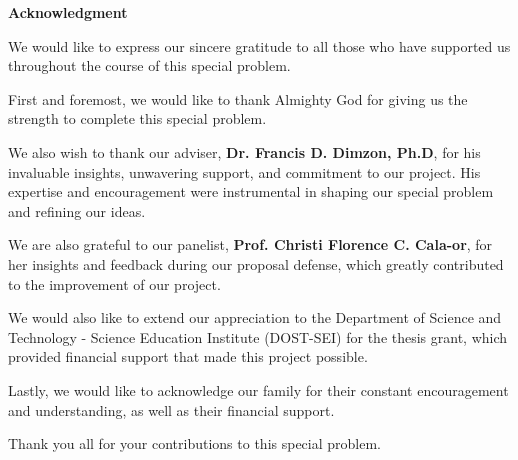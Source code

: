 \begin{center}
	\textbf{Acknowledgment}
\end{center}

We would like to express our sincere gratitude to all those who have supported us throughout the course of this special problem.

First and foremost, we would like to thank Almighty God for giving us the strength to complete this special problem.

We also wish to thank our adviser, \textbf{Dr. Francis D. Dimzon, Ph.D}, for his invaluable insights, unwavering support, and commitment to our project. His expertise and encouragement were instrumental in shaping our special problem and refining our ideas.

We are also grateful to our panelist, \textbf{Prof. Christi Florence C. Cala-or}, for her insights and feedback during our proposal defense, which greatly contributed to the improvement of our project.

We would also like to extend our appreciation to the Department of Science and Technology - Science Education Institute (DOST-SEI) for the thesis grant, which provided financial support that made this project possible.

Lastly, we would like to acknowledge our family for their constant encouragement and understanding, as well as their financial support.

Thank you all for your contributions to this special problem.